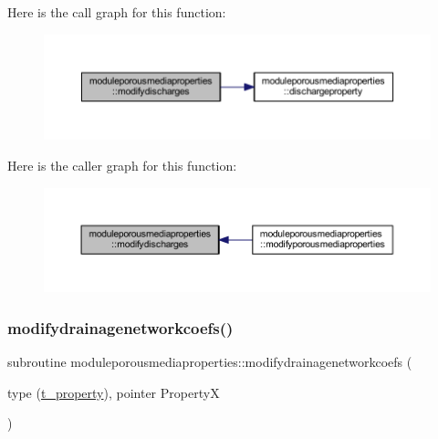 Here is the call graph for this function\+:\nopagebreak
\begin{figure}[H]
\begin{center}
\leavevmode
\includegraphics[width=350pt]{namespacemoduleporousmediaproperties_a4b551b0430b61a97ca5a026b6467c003_cgraph}
\end{center}
\end{figure}
Here is the caller graph for this function\+:\nopagebreak
\begin{figure}[H]
\begin{center}
\leavevmode
\includegraphics[width=350pt]{namespacemoduleporousmediaproperties_a4b551b0430b61a97ca5a026b6467c003_icgraph}
\end{center}
\end{figure}
\mbox{\label{namespacemoduleporousmediaproperties_ab821bd146f4dac552711604b920efa4a}} 
\subsubsection{\texorpdfstring{modifydrainagenetworkcoefs()}{modifydrainagenetworkcoefs()}}
{\footnotesize\ttfamily subroutine moduleporousmediaproperties\+::modifydrainagenetworkcoefs (\begin{DoxyParamCaption}\item[{type (\mbox{\hyperlink{structmoduleporousmediaproperties_1_1t__property}{t\+\_\+property}}), pointer}]{PropertyX }\end{DoxyParamCaption})\hspace{0.3cm}{\ttfamily [private]}}

